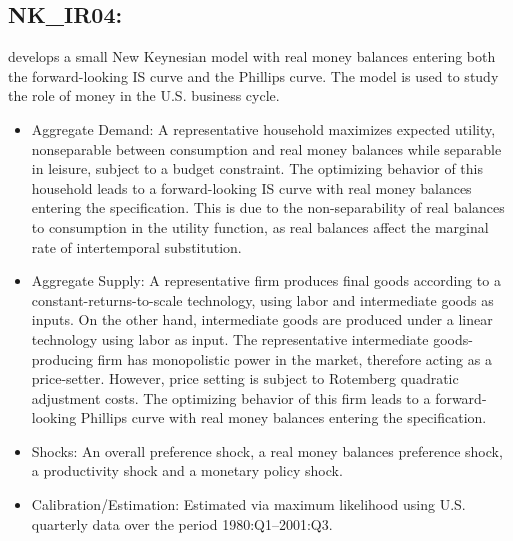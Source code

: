 \documentclass[11pt,a4paper]{article}
\begin{document}
	\subsection{NK\_IR04: \texorpdfstring{\cite{Ireland2004}}{Ireland (2004)}}
	\label{NKIR04}
	\cite{Ireland2004} develops a small New Keynesian model with real money balances entering both the forward-looking IS curve and the Phillips curve. The model is used to study the role of money in the U.S. business cycle.
	\begin{itemize}
		\item Aggregate Demand: A representative household maximizes expected utility, nonseparable between consumption and real money balances while separable in leisure, subject to a budget constraint. The optimizing behavior of this household leads to a forward-looking IS curve with real money balances entering the specification. This is due to the non-separability of real balances to consumption in the utility function, as real balances affect the marginal rate of intertemporal substitution.
		
		\item Aggregate Supply: A representative firm produces final goods according to a constant-returns-to-scale technology, using labor and intermediate goods as inputs. On the other hand, intermediate goods are produced under a linear technology using labor as input. The representative intermediate goods-producing firm has monopolistic power in the market, therefore acting as a price-setter. However, price setting is subject to Rotemberg quadratic adjustment costs. The optimizing behavior of this firm leads to a forward-looking Phillips curve with real money balances entering the specification.
		
		\item Shocks: An overall preference shock, a real money balances preference shock, a productivity shock and a monetary policy shock.
		
		\item Calibration/Estimation: Estimated via maximum likelihood using U.S. quarterly data over the period 1980:Q1--2001:Q3.
		
		
	\end{itemize}
	
	
\end{document}

